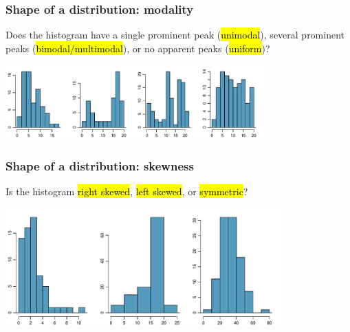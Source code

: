 \begin{frame}
\frametitle{Shape of a distribution: modality}

Does the histogram have a single prominent peak (\hl{unimodal}), several prominent peaks (\hl{bimodal/multimodal}), or no apparent peaks (\hl{uniform})?

\begin{center}
\includegraphics[width=0.75\textwidth]{1-6_numerical_data/figures/singleBiMultiModalUnifPlots/singleBiMultiModalUnifPlots}
\end{center}


\end{frame}


\begin{frame}
\frametitle{Shape of a distribution: skewness}

Is the histogram \hl{right skewed}, \hl{left skewed}, or \hl{symmetric}?

\begin{center}
\includegraphics[width=0.8\textwidth]{1-6_numerical_data/figures/skewedSymPlots/skewedSymPlots}
\end{center}


\end{frame}


